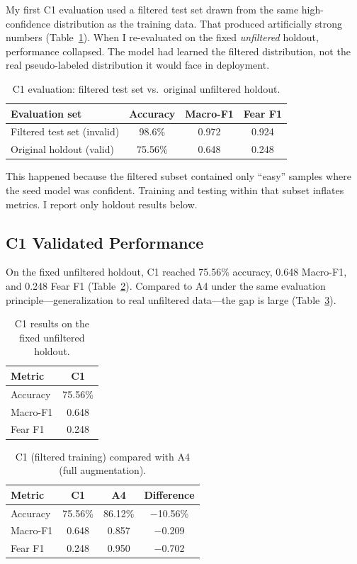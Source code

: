 \documentclass[11pt,a4paper]{article}
\begin{document}
My first C1 evaluation used a filtered test set drawn from the same high-confidence distribution as the training data. That produced artificially strong numbers (Table~\ref{tab:leakage}). When I re-evaluated on the fixed \textit{unfiltered} holdout, performance collapsed. The model had learned the filtered distribution, not the real pseudo-labeled distribution it would face in deployment.

\begin{table}[H]
\centering
\caption{C1 evaluation: filtered test set vs.\ original unfiltered holdout.}
\label{tab:leakage}
\begin{tabular}{@{}lccc@{}}
\toprule
Evaluation set & Accuracy & Macro-F1 & Fear F1 \\
\midrule
Filtered test set (invalid)     & 98.6\% & 0.972 & 0.924 \\
Original holdout (valid)        & 75.56\% & 0.648 & 0.248 \\
\bottomrule
\end{tabular}
\end{table}

This happened because the filtered subset contained only ``easy'' samples where the seed model was confident. Training and testing within that subset inflates metrics. I report only holdout results below.

\subsection{C1 Validated Performance}

On the fixed unfiltered holdout, C1 reached 75.56\% accuracy, 0.648 Macro-F1, and 0.248 Fear F1 (Table~\ref{tab:c1_results}). Compared to A4 under the same evaluation principle---generalization to real unfiltered data---the gap is large (Table~\ref{tab:c1_vs_a4}).

\begin{table}[H]
\centering
\caption{C1 results on the fixed unfiltered holdout.}
\label{tab:c1_results}
\begin{tabular}{@{}lc@{}}
\toprule
Metric & C1 \\
\midrule
\rowcolor{red!15}
Accuracy  & 75.56\% \\
\rowcolor{red!15}
Macro-F1  & 0.648 \\
Fear F1   & 0.248 \\
\bottomrule
\end{tabular}
\end{table}

\begin{table}[H]
\centering
\caption{C1 (filtered training) compared with A4 (full augmentation).}
\label{tab:c1_vs_a4}
\begin{tabular}{@{}lccc@{}}
\toprule
Metric & C1 & A4 & Difference \\
\midrule
Accuracy  & 75.56\% & 86.12\% & $-$10.56\% \\
Macro-F1  & 0.648   & 0.857   & $-$0.209 \\
Fear F1   & 0.248   & 0.950   & $-$0.702 \\
\bottomrule
\end{tabular}
\end{table}
\end{document}
